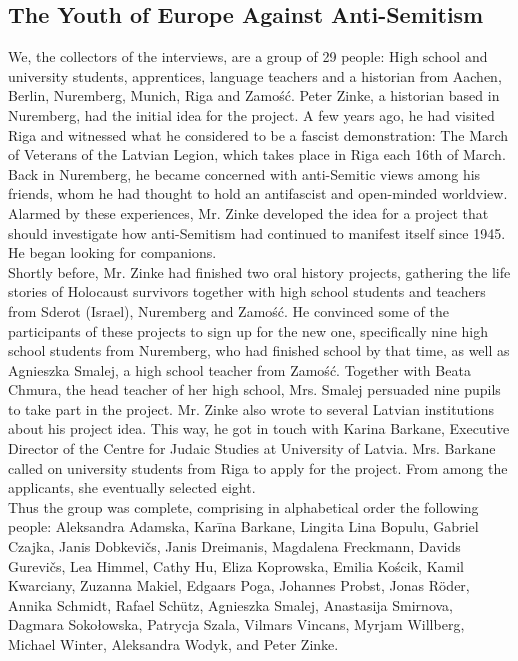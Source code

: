 \subsection*{The Youth of Europe Against Anti-Semitism} 
We, the collectors of the interviews, are a group of 29 people: High school and university students, apprentices, language teachers and a historian from Aachen, Berlin, Nuremberg, Munich, Riga and Zamość. Peter Zinke, a historian based in Nuremberg, had the initial idea for the project. A few years ago, he had visited Riga and witnessed what he considered to be a fascist demonstration: The March of Veterans of the Latvian Legion, which takes place in Riga each 16th of March. \\
Back in Nuremberg, he became concerned with anti-Semitic views among his friends, whom he had thought to hold an antifascist and open-minded worldview. Alarmed by these experiences, Mr. Zinke developed the idea for a project that should investigate how anti-Semitism had continued to manifest itself since 1945. He began looking for companions. \\
Shortly before, Mr. Zinke had finished two oral history projects, gathering the life stories of Holocaust survivors together with high school students and teachers from Sderot (Israel), Nuremberg and Zamość. He convinced some of the participants of these projects to sign up for the new one, specifically nine high school students from Nuremberg, who had finished school by that time, as well as Agnieszka Smalej, a high school teacher from Zamość. Together with Beata Chmura, the head teacher of her high school, Mrs. Smalej persuaded nine pupils to take part in the project. Mr. Zinke also wrote to several Latvian institutions about his project idea. This way, he got in touch with Karina Barkane, Executive Director of the Centre for Judaic Studies at University of Latvia. Mrs. Barkane called on university students from Riga to apply for the project. From among the applicants, she eventually selected eight.\\
Thus the group was complete, comprising in alphabetical order the following people: Aleksandra Adamska, Karīna Barkane, Lingita Lina Bopulu, Gabriel Czajka, Janis Dobkevičs, Janis Dreimanis, Magdalena Freckmann, Davids Gurevičs, Lea Himmel, Cathy Hu, Eliza Koprowska, Emilia Kościk, Kamil Kwarciany, Zuzanna Makiel, Edgaars Poga, Johannes Probst, Jonas Röder, Annika Schmidt, Rafael Schütz, Agnieszka Smalej, Anastasija Smirnova, Dagmara Sokołowska, Patrycja Szala, Vilmars Vincans, Myrjam Willberg, Michael Winter, Aleksandra Wodyk, and Peter Zinke. \\
